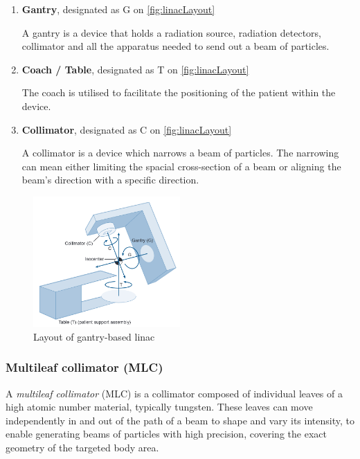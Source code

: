 \begin{enumerate}
    \item \textbf{Gantry}, designated as G on \autoref{fig:linacLayout}

    A gantry is a device that holds a radiation source, radiation detectors, collimator and all the apparatus needed to send out a beam of particles.
    
    \item \textbf{Coach / Table}, designated as T on \autoref{fig:linacLayout}

    The coach is utilised to facilitate the positioning of the patient within the device.

    \item \textbf{Collimator}, designated as C on \autoref{fig:linacLayout}

    A collimator is a device which narrows a beam of particles. The narrowing can mean either limiting the spacial cross-section of a beam or aligning the beam's direction with a specific direction. \cite{abeloff_clinical_oncology}
\end{enumerate}

\begin{figure}[H]
    \centering
    \includegraphics[width=0.5\textwidth]{Content/Images/linac.png}
    \caption{Layout of gantry-based linac \cite{abeloff_clinical_oncology}}
    \label{fig:linacLayout}
\end{figure}

\subsubsection{Multileaf collimator (MLC)}

A \emph{multileaf collimator} (MLC) is a collimator composed of individual leaves of a high atomic number material, typically tungsten. These leaves can move independently in and out of the path of a beam to shape and vary its intensity, to enable generating beams of particles with high precision, covering the exact geometry of the targeted body area. \cite{abeloff_clinical_oncology}


